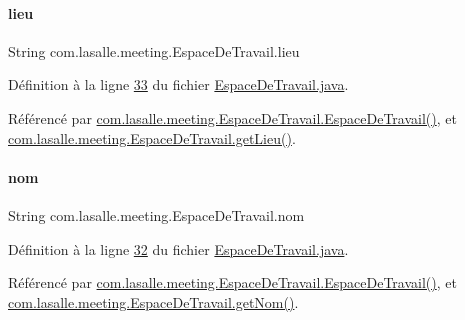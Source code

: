 \paragraph{\texorpdfstring{lieu}{lieu}}
{\footnotesize\ttfamily String com.\+lasalle.\+meeting.\+Espace\+De\+Travail.\+lieu\hspace{0.3cm}{\ttfamily [private]}}



Définition à la ligne \hyperlink{_espace_de_travail_8java_source_l00033}{33} du fichier \hyperlink{_espace_de_travail_8java_source}{Espace\+De\+Travail.\+java}.



Référencé par \hyperlink{_espace_de_travail_8java_source_l00070}{com.\+lasalle.\+meeting.\+Espace\+De\+Travail.\+Espace\+De\+Travail()}, et \hyperlink{_espace_de_travail_8java_source_l00092}{com.\+lasalle.\+meeting.\+Espace\+De\+Travail.\+get\+Lieu()}.

\mbox{\label{classcom_1_1lasalle_1_1meeting_1_1_espace_de_travail_a9c06de6de73757cbec902e14055969ce}} 
\paragraph{\texorpdfstring{nom}{nom}}
{\footnotesize\ttfamily String com.\+lasalle.\+meeting.\+Espace\+De\+Travail.\+nom\hspace{0.3cm}{\ttfamily [private]}}



Définition à la ligne \hyperlink{_espace_de_travail_8java_source_l00032}{32} du fichier \hyperlink{_espace_de_travail_8java_source}{Espace\+De\+Travail.\+java}.



Référencé par \hyperlink{_espace_de_travail_8java_source_l00070}{com.\+lasalle.\+meeting.\+Espace\+De\+Travail.\+Espace\+De\+Travail()}, et \hyperlink{_espace_de_travail_8java_source_l00087}{com.\+lasalle.\+meeting.\+Espace\+De\+Travail.\+get\+Nom()}.

\mbox{\label{classcom_1_1lasalle_1_1meeting_1_1_espace_de_travail_a3a5b9c42fa29930b092154e1bd0e4c10}} 
